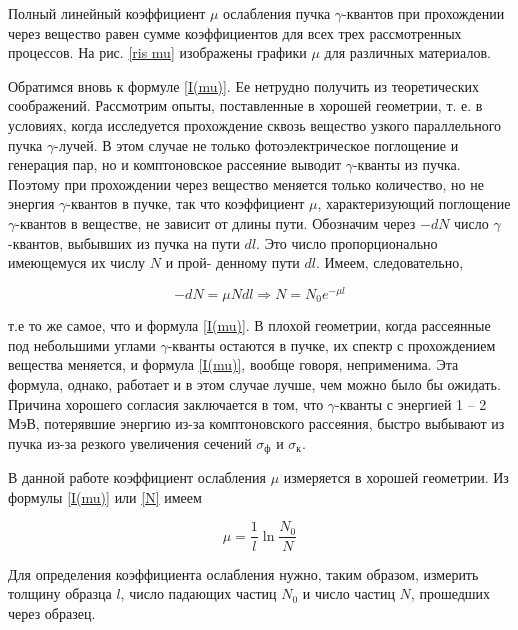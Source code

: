 Полный линейный коэффициент $\mu$ ослабления пучка $\gamma$-квантов при
прохождении через вещество равен сумме коэффициентов для всех трех рассмотренных
процессов. На рис. \ref{ris mu} изображены графики $\mu$ для различных
материалов.

Обратимся вновь к формуле \eqref{I(mu)}. Ее нетрудно получить из теоретических
соображений. Рассмотрим опыты, поставленные в хорошей геометрии, т. е. в
условиях, когда исследуется прохождение сквозь вещество узкого параллельного
пучка $\gamma$-лучей. В этом случае не только фотоэлектрическое поглощение и
генерация пар, но и комптоновское рассеяние выводит $\gamma$-кванты из пучка.
Поэтому при прохождении через вещество меняется только количество, но не энергия
$\gamma$-квантов в пучке, так что коэффициент $\mu$, характеризующий поглощение
$\gamma$-квантов в веществе, не зависит от длины пути. Обозначим через $-dN$
число $\gamma$-квантов, выбывших из пучка на пути $dl$. Это число
пропорционально имеющемуся их числу $N$ и прой- денному пути $dl$. Имеем,
следовательно,

\begin{equation}\label{N}
-dN = \mu N dl \Rightarrow N = N_0 e^{-\mu l}
\end{equation}

т.е то же самое, что и формула \eqref{I(mu)}. В плохой геометрии, когда
рассеянные под небольшими углами $\gamma$-кванты остаются в пучке, их спектр с
прохождением вещества меняется, и формула \eqref{I(mu)}, вообще говоря,
неприменима. Эта формула, однако, работает и в этом случае лучше, чем можно было
бы ожидать. Причина хорошего согласия заключается в том, что $\gamma$-кванты с
энергией 1 -- 2 МэВ, потерявшие энергию из-за комптоновского рассеяния, быстро
выбывают из пучка из-за резкого увеличения сечений $\sigma_{\text{ф}}$ и
$\sigma_{\text{к}}$.

В данной работе коэффициент ослабления $ \mu $ измеряется в хорошей геометрии.
Из формулы \eqref{I(mu)} или \eqref{N} имеем

\begin{equation}\label{mu}
\mu = \dfrac{1}{l} \ln{\dfrac{N_0}{N}}
\end{equation}

Для определения коэффициента ослабления нужно, таким образом, измерить толщину
образца $l$, число падающих частиц $N_0$ и число частиц $N$, прошедших через
образец.